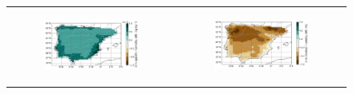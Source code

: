 \begin{figure}[htbp]
\begin{tabular}{cc}
        \begin{subfigure}[b]{0.5\textwidth}
            \caption{}
            \includegraphics[width=\textwidth]{images/chap4/future/diffmap_q2m_presfut.png}
        \end{subfigure} &
        \begin{subfigure}[b]{0.5\textwidth}
            \caption{}
            \includegraphics[width=\textwidth]{images/chap4/future/diffmap_rh2m_presfut.png}
        \end{subfigure} \\


\end{tabular}
\end{figure}
